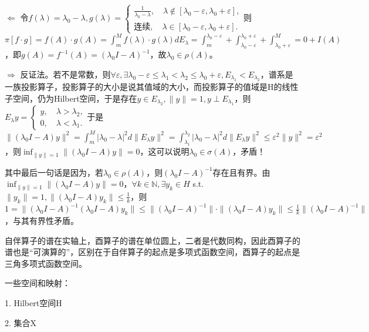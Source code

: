 \begin{pf}
  $\Leftarrow$ 令$f(\lambda) = \lambda_0 - \lambda, g(\lambda) = \left\{ \begin{array}{ll}
    \frac{1}{\lambda_0 - \lambda}, \quad \lambda \notin [\lambda_0 - \varepsilon, \lambda_0 + \varepsilon],\\
    \text{连续}, \quad \lambda \in [\lambda_0 - \varepsilon, \lambda_0 + \varepsilon].
  \end{array} \right.$则$\pi[f \cdot g] = f(A) \cdot g(A) = \int_m^M f(\lambda) \cdot g(\lambda) dE_\lambda = \int_m^{\lambda_0 - \varepsilon} + \int_{\lambda_0 - \varepsilon}^{\lambda_0 + \varepsilon} + \int_{\lambda_0 + \varepsilon}^M = 0 + I(A)$，即$g(A) = f^{-1}(A) = (\lambda_0 I - A)^{-1}$，故$\lambda_0 \in \rho(A)$。

  $\Rightarrow$ 反证法。若不是常数，则$\forall \varepsilon, \exists \lambda_0 - \varepsilon \le \lambda_1 < \lambda_2 \le \lambda_0 + \varepsilon, E_{\lambda_1} < E_{\lambda_2}$，谱系是一族投影算子，投影算子的大小是说其值域的大小，而投影算子的值域是H的线性子空间，仍为Hilbert空间，于是存在$y \in E_{\lambda_2}, \|y\| = 1, y \perp E_{\lambda_1}$，则$E_\lambda y = \left\{ \begin{array}{ll}
    y, \quad \lambda > \lambda_2,\\
    0, \quad \lambda < \lambda_1.
  \end{array} \right.$于是$\|(\lambda_0 I - A)y\|^2 = \int_m^M |\lambda_0 - \lambda|^2 d \|E_\lambda y\|^2 = \int_{\lambda_1}^{\lambda_2} |\lambda_0 - \lambda|^2 d \|E_\lambda y\|^2 \le \varepsilon^2 \|y\|^2 = \varepsilon^2$，则$\inf_{\|y\| = 1} \|(\lambda_0 I - A)y\| = 0$，这可以说明$\lambda_0 \in \sigma(A)$，矛盾！

  其中最后一句话是因为，若$\lambda_0 \in \rho(A)$，则$(\lambda_0 I - A)^{-1}$存在且有界。由$\inf_{\|y\| = 1} \|(\lambda_0 I - A)y\| = 0$，$\forall k \in \mathbb{N}, \exists y_k \in H$ s.t. $\|y_k\| = 1, \|(\lambda_0I - A)y_k\| \le \frac{1}{k}$，则$1 = \|(\lambda_0I - A)^{-1} (\lambda_0I - A)y_k\| \le \|(\lambda_0I - A)^{-1}\| \cdot \|(\lambda_0I - A)y_k\| \le \frac{1}{k} \|(\lambda_0I - A)^{-1}\|$，与其有界性矛盾。
\end{pf}

自伴算子的谱在实轴上，酉算子的谱在单位圆上，二者是代数同构，因此酉算子的谱也是“可演算的”，区别在于自伴算子的起点是多项式函数空间，酉算子的起点是三角多项式函数空间。

一些空间和映射：

1. Hilbert空间H

2. 集合X

